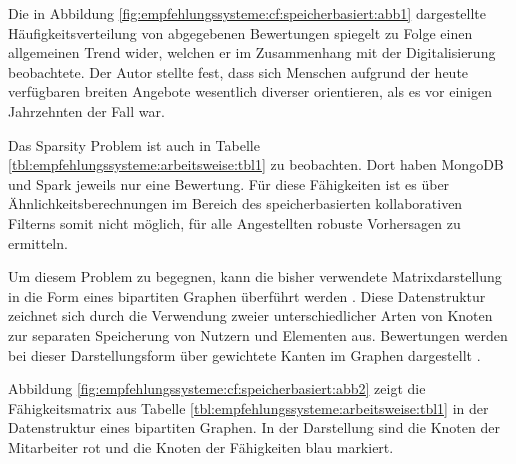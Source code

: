 Die in Abbildung \ref{fig:empfehlungssysteme:cf:speicherbasiert:abb1} dargestellte Häufigkeitsverteilung von abgegebenen Bewertungen spiegelt \textcite[S. 1ff.]{anderson:2007} zu Folge einen allgemeinen Trend wider, welchen er im Zusammenhang mit der Digitalisierung beobachtete. Der Autor stellte fest, dass sich Menschen aufgrund der heute verfügbaren breiten Angebote wesentlich diverser orientieren, als es vor einigen Jahrzehnten der Fall war.

Das Sparsity Problem ist auch in Tabelle \ref{tbl:empfehlungssysteme:arbeitsweise:tbl1} zu beobachten. Dort haben \mbox{MongoDB} und Spark jeweils nur eine Bewertung. Für diese Fähigkeiten ist es über Ähnlichkeitsberechnungen im Bereich des speicherbasierten kollaborativen Filterns somit nicht möglich, für alle Angestellten robuste Vorhersagen zu ermitteln.

Um diesem Problem zu begegnen, kann die bisher verwendete Matrixdarstellung in die Form eines bipartiten Graphen überführt werden \cite[S. 2ff.]{huang:2004}. Diese Datenstruktur zeichnet sich durch die Verwendung zweier unterschiedlicher Arten von Knoten zur separaten Speicherung von Nutzern und Elementen aus. Bewertungen werden bei dieser Darstellungsform über gewichtete Kanten im Graphen dargestellt \cite[S. 1f.]{cao:2021}\cite[S. 2]{huang:2004}.

Abbildung \ref{fig:empfehlungssysteme:cf:speicherbasiert:abb2} zeigt die Fähigkeitsmatrix aus Tabelle \ref{tbl:empfehlungssysteme:arbeitsweise:tbl1} in der Datenstruktur eines bipartiten Graphen. In der Darstellung sind die Knoten der Mitarbeiter rot und die Knoten der Fähigkeiten blau markiert.

